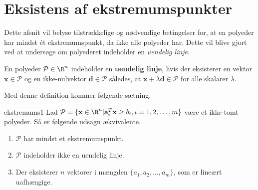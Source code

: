 \section{Eksistens af ekstremumspunkter}
%
Dette afsnit vil belyse tilstrækkelige og nødvendige betingelser for, at en polyeder har mindst ét ekstremumspunkt, da ikke alle polyeder har.
Dette vil blive gjort ved at undersøge om polyederet indeholder en \textit{uendelig linje}.
%
\begin{defn}{}{}
En polyeder $\mathcal{P} \in \R^n$  indeholder en \textbf{uendelig linje}, hvis der eksisterer en vektor $\textbf{x} \in \mathcal{P}$ og en ikke-nulvektor $\textbf{d} \in \mathcal{P}$ således, at $\textbf{x} + \lambda \textbf{d} \in \mathcal{P}$ for alle skalarer $\lambda$.
\end{defn}
\noindent
%
Med denne definition kommer følgende sætning.
%
\begin{thm}{}{ekstremums1}
Lad $\mathcal{P} = \{\textbf{x} \in \R^n | \textbf{a}_i^T\textbf{x} \geq b_i, i = 1,2,\ldots,m  \}$ være et ikke-tomt polyeder.
Så er følgende udsagn ækvivalente.
%
\begin{enumerate}[label = (\alph*)]
\item $\mathcal{P}$ har mindst et ekstremumspunkt.
\item $\mathcal{P}$ indeholder ikke en uendelig linje.
\item Der eksisterer $n$ vektorer i mængden $\{a_1, a_2, \ldots ,a_m \}$, som er lineært uafhængige.
\end{enumerate}
\end{thm}
%
